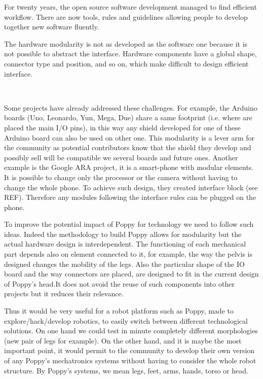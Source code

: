 For twenty years, the open source software development managed to find efficient workflow. There are now tools, rules and guidelines allowing people to develop together new software fluently.

The hardware modularity is not as developed as the software one because it is not possible to abstract the interface. Hardware components have a global shape, connector type and position, and so on, which make difficult to design efficient interface.

\begin{figure}[tb]
\centering
    \hfil
     \\
    \caption{}
    \label{fig:hardware-modularity}
\end{figure}

Some projects have already addressed these challenges. For example, the Arduino boards (Uno, Leonardo, Yun, Mega, Due) share a same footprint (i.e. where are placed the main I/O pins), in this way any shield developed for one of these Arduino board can also be used on other one. This modularity is a lever arm for the community as potential contributors know that the shield they develop and possibly sell will be compatible we several boards and future ones.
Another example is the Google ARA project, it is a smart-phone with modular elements. It is possible to change only the processor or the camera without having to change the whole phone. To achieve such design, they created interface block (see REF). Therefore any modules following the interface rules can be plugged on the phone.


To improve the potential impact of Poppy for technology we need to follow such ideas. Indeed the methodology to build Poppy allows for modularity but the actual hardware design is interdependent. The functioning of each mechanical part depends also on element connected to it, for example, the way the pelvis is designed changes the mobility of the legs. Also the particular shape of the IO board and the way connectors are placed, are designed to fit in the current design of Poppy's head.It does not avoid the reuse of such components into other projects but it reduces their relevance.

Thus it would be very useful for a robot platform such as Poppy, made to explore/hack/develop robotics, to easily switch between different technological solutions. On one hand we could test in minute completely different morphologies (new pair of legs for example). On the other hand, and it is maybe the most important point, it would permit to the community to develop their own version of any Poppy's mechatronics systems without having to consider the whole robot structure. By Poppy's systems, we mean legs, feet, arms, hands, torso or head.


